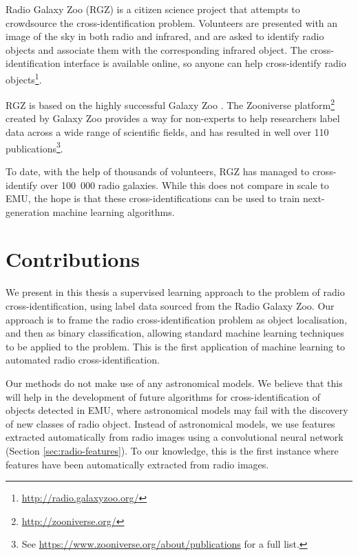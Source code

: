 Radio Galaxy Zoo (RGZ) \citep{banfield15} is a citizen science project that
attempts to crowdsource the cross-identification problem. Volunteers are
presented with an image of the sky in both radio and infrared, and are asked to
identify radio objects and associate them with the corresponding infrared
object. The cross-identification interface is available online, so anyone can
help cross-identify radio objects\footnote{\url{http://radio.galaxyzoo.org/}}.

RGZ is based on the highly successful Galaxy Zoo \citep{lintott08, lintott11}.
The Zooniverse platform\footnote{\url{http://zooniverse.org/}} created by Galaxy
Zoo provides a way for non-experts to help researchers label data across a wide
range of scientific fields, and has resulted in well over 110
publications\footnote{See \url{https://www.zooniverse.org/about/publications}
for a full list.}.

To date, with the help of thousands of volunteers, RGZ has managed to
cross-identify over 100~000 radio galaxies. While this does not compare in scale
to EMU, the hope is that these cross-identifications can be used to train
next-generation machine learning algorithms.

\section{Contributions}
\label{sec:contributions}

  We present in this thesis a supervised learning approach to the problem of
  radio cross-identification, using label data sourced from the Radio Galaxy
  Zoo. Our approach is to frame the radio cross-identification problem as object
  localisation, and then as binary classification, allowing standard machine
  learning techniques to be applied to the problem. This is the first
  application of machine learning to automated radio cross-identification.

  Our methods do not make use of any astronomical models. We believe that this
  will help in the development of future algorithms for cross-identification of
  objects detected in EMU, where astronomical models may fail with the discovery
  of new classes of radio object. Instead of astronomical models, we use
  features extracted automatically from radio images using a convolutional
  neural network (Section \ref{sec:radio-features}). To our knowledge, this is
  the first instance where features have been automatically extracted from radio
  images.

